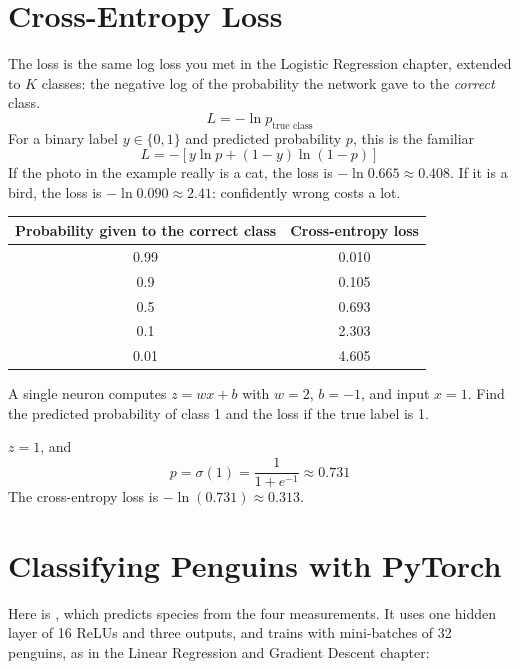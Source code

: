 \section{Cross-Entropy Loss}
The loss is the same log loss you met in the Logistic Regression chapter, extended to $K$ classes: the negative log
of the probability the network gave to the \emph{correct} class.
$$L = -\ln p_{\text{true class}}$$
For a binary label $y \in \{0, 1\}$ and predicted probability $p$, this is the familiar
$$L = -\left[y \ln p + (1 - y)\ln(1 - p)\right]$$ If the photo in the example really is a cat, the loss is
$-\ln 0.665 \approx 0.408$. If it is a bird, the loss is $-\ln 0.090 \approx 2.41$: confidently wrong costs a lot.

\begin{center}
\begin{tabular}{c c}
\textbf{Probability given to the correct class} & \textbf{Cross-entropy loss} \\
\hline
0.99 & 0.010 \\
0.9 & 0.105 \\
0.5 & 0.693 \\
0.1 & 2.303 \\
0.01 & 4.605 \\
\end{tabular}
\end{center}

\begin{Worked}
\begin{Problem}
A single neuron computes $z = wx + b$ with $w = 2$, $b = -1$, and input $x = 1$. Find the
predicted probability of class 1 and the loss if the true label is 1.
\end{Problem}
\begin{Solution}
$z = 1$, and
$$p = \sigma(1) = \frac{1}{1 + e^{-1}} \approx 0.731$$
The cross-entropy loss is $-\ln(0.731) \approx 0.313$.
\end{Solution}
\end{Worked}

\section{Classifying Penguins with PyTorch}
Here is , which predicts species from the four measurements. It uses one hidden layer of 16
ReLUs and three outputs, and trains with mini-batches of 32 penguins, as in the Linear Regression and Gradient Descent chapter:

